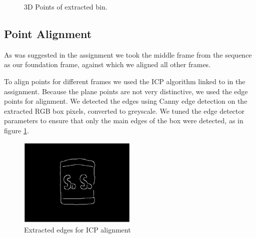 \documentclass[12pt,a4paper,onecolumn]{article}
\begin{document}
\begin{figure}[!ht]
    \centering
      \caption{3D Points of extracted bin.}
\end{figure}

\subsection{Point Alignment}
As was suggested in the assignment we took the middle frame
from the sequence as our foundation frame, against which we aligned all other frames.

To align points for different frames we used the ICP algorithm
linked to in the assignment.  Because the plane points are not very distinctive, we used the edge points for alignment.  We detected the edges using Canny edge detection on the extracted RGB box pixels, converted to greyscale.  We tuned the edge detector parameters to ensure that only the main edges of the box were detected, as in figure \ref{fig:extracted_edge_mask}.

\begin{figure}[!ht]
  \centering
  \includegraphics[width=0.5\textwidth]{figs/extracted_edge_mask}
  \caption{Extracted edges for ICP alignment}
  \label{fig:extracted_edge_mask}
\end{figure}
\end{document}
